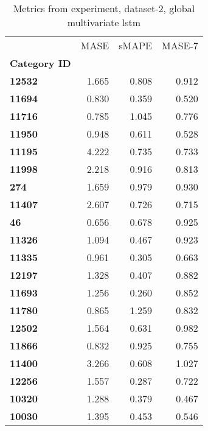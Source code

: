 \begin{table}[h]
\centering
\caption{Metrics from experiment, dataset-2, global multivariate lstm}
\label{table:global-multivariate-lstm-dataset-2}
\begin{tabular}{lrrr}
\toprule
{} &   MASE &  sMAPE &  MASE-7 \\
\textbf{Category ID} &        &        &         \\
\midrule
\textbf{12532      } &  1.665 &  0.808 &   0.912 \\
\textbf{11694      } &  0.830 &  0.359 &   0.520 \\
\textbf{11716      } &  0.785 &  1.045 &   0.776 \\
\textbf{11950      } &  0.948 &  0.611 &   0.528 \\
\textbf{11195      } &  4.222 &  0.735 &   0.733 \\
\textbf{11998      } &  2.218 &  0.916 &   0.813 \\
\textbf{274        } &  1.659 &  0.979 &   0.930 \\
\textbf{11407      } &  2.607 &  0.726 &   0.715 \\
\textbf{46         } &  0.656 &  0.678 &   0.925 \\
\textbf{11326      } &  1.094 &  0.467 &   0.923 \\
\textbf{11335      } &  0.961 &  0.305 &   0.663 \\
\textbf{12197      } &  1.328 &  0.407 &   0.882 \\
\textbf{11693      } &  1.256 &  0.260 &   0.852 \\
\textbf{11780      } &  0.865 &  1.259 &   0.832 \\
\textbf{12502      } &  1.564 &  0.631 &   0.982 \\
\textbf{11866      } &  0.832 &  0.925 &   0.755 \\
\textbf{11400      } &  3.266 &  0.608 &   1.027 \\
\textbf{12256      } &  1.557 &  0.287 &   0.722 \\
\textbf{10320      } &  1.288 &  0.379 &   0.467 \\
\textbf{10030      } &  1.395 &  0.453 &   0.546 \\
\bottomrule
\end{tabular}
\end{table}
